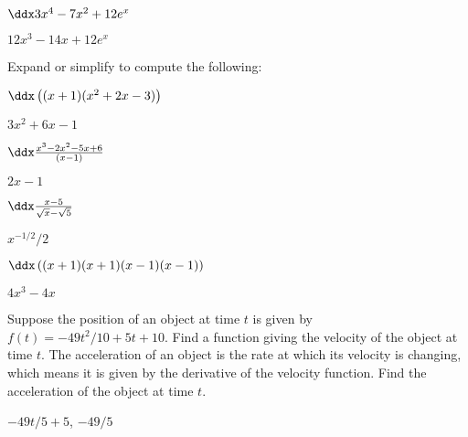 \begin{exercises}
\begin{exercise} $\ddx 3x^4 -7x^2 +12 e^x$
\begin{answer} $12x^3-14x +12 e^x$
\end{answer}\end{exercise}
\endtwocol

\noindent Expand or simplify to compute the following:

\twocol

\begin{exercise} $\ddx \left((x+1)(x^2+2x-3)\right)$
\begin{answer} $3x^2+6x-1$
\end{answer}\end{exercise}

\begin{exercise} $\ddx \frac{x^3 -2x^2 -5x + 6}{(x-1)}$
\begin{answer} $2x-1 $
\end{answer}\end{exercise}

\begin{exercise} $\ddx \frac{x-5}{\sqrt{x}-\sqrt{5}}$
\begin{answer} $x^{-1/2}/2 $
\end{answer}\end{exercise}

\begin{exercise} $\ddx \left((x+1)(x+1)(x-1)(x-1)\right)$
\begin{answer} $4x^3-4x$
\end{answer}\end{exercise}

\endtwocol

\begin{exercise} Suppose the position of an object at time $t$ is  given by
$f(t)=-49 t^2/10+5t+10$. Find a function giving the velocity of the object
at time $t$. The acceleration of an object is the rate at which its
velocity is changing, which means it is given by the derivative of the
velocity function. Find the acceleration of the object at time $t$.
\begin{answer} $-49t/5+5$, $-49/5$
\end{answer}\end{exercise}


\end{exercises}
